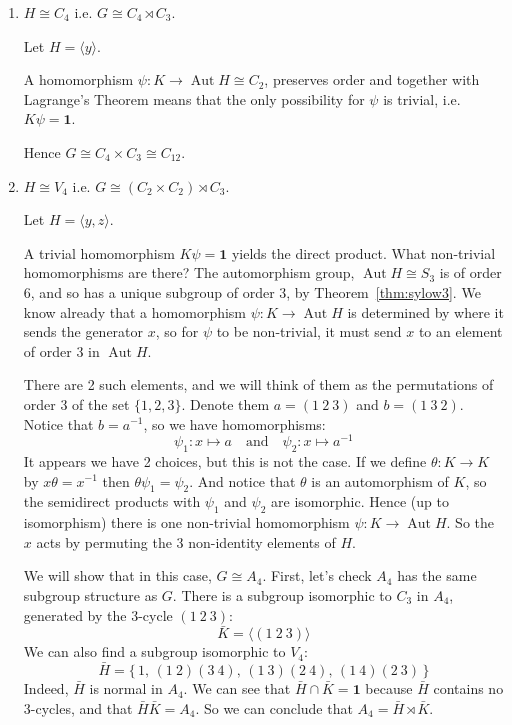 \documentclass[a4paper, oneside, 12pt, final]{article}
\theoremstyle{definition}
\DeclareMathOperator{\Aut}{Aut}
\begin{document}
\begin{enumerate}
    \item \(H \cong C_4\) i.e. \(G \cong C_4 \rtimes C_3\).

        Let \(H = \langle y \rangle\).

        A homomorphism \(\psi:K \to \Aut{H} \cong C_2\), preserves order and together with Lagrange's Theorem means that
        the only possibility for \(\psi\) is trivial, i.e. \(K\psi = \bm{1}\).

        Hence \(G \cong C_4 \times C_3 \cong C_{12}\).

    \item \(H \cong V_4\) i.e. \(G \cong (C_2 \times C_2) \rtimes C_3\).

        Let \(H = \langle y, z \rangle\).

        A trivial homomorphism \(K\psi = \bm{1}\) yields the direct product.
        What non-trivial homomorphisms are there?
        The automorphism group, \(\Aut{H} \cong S_3\) is of order 6, and so has a unique subgroup of order 3, by
        Theorem~\ref{thm:sylow3}.
        We know already that a homomorphism \(\psi: K \to \Aut{H}\) is determined by where it sends the generator
        \(x\), so for \(\psi\) to be non-trivial, it must send \(x\) to an element of order 3 in \(\Aut{H}\).

        There are 2 such elements, and we will think of them as the permutations of order 3 of the set \(\{1, 2, 3\}\).
        Denote them \(a = (1\ 2\ 3)\) and \(b = (1\ 3\ 2)\).
        Notice that \(b = a^{-1}\), so we have homomorphisms:
        \[\psi_1:x \mapsto a \quad \text{and} \quad \psi_2:x \mapsto a^{-1}\]
        It appears we have 2 choices, but this is not the case.
        If we define \(\theta:K \to K\) by \(x\theta = x^{-1}\) then \(\theta\psi_1 = \psi_2\).
        And notice that \(\theta\) is an automorphism of \(K\), so the semidirect products with \(\psi_1\) and \(\psi_2\)
        are isomorphic.
        Hence (up to isomorphism) there is one non-trivial homomorphism \(\psi:K \to \Aut{H}\).
        So the \(x\) acts by permuting the 3 non-identity elements of \(H\).

        We will show that in this case, \(G \cong A_4\).
        First, let's check \(A_4\) has the same subgroup structure as \(G\).
        There is a subgroup isomorphic to \(C_3\) in \(A_4\), generated by the 3-cycle \((1\ 2\ 3)\):
        \[\bar{K} = \langle (1\ 2\ 3) \rangle\]
        We can also find a subgroup isomorphic to \(V_4\):
        \[\bar{H} = \{\,1,\, (1\ 2)(3\ 4),\, (1\ 3)(2\ 4),\, (1\ 4)(2\ 3)\,\}\]
        Indeed, \(\bar{H}\) is normal in \(A_4\).
        We can see that \(\bar{H} \cap \bar{K} = \bm{1}\) because \(\bar{H}\) contains no 3-cycles, and that
        \(\bar{H}\bar{K} = A_4\).
        So we can conclude that \(A_4 = \bar{H} \rtimes \bar{K}\).


\end{enumerate}
\end{document}
